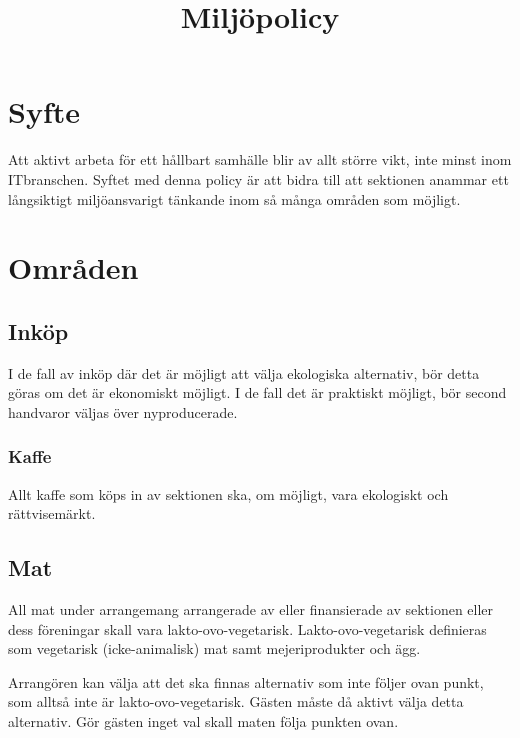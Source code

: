 \documentclass[11pt, includeaddress]{classes/cthit}
\begin{document}
\title{Miljöpolicy}
\maketitle

\thispagestyle{empty}

\newpage

\makeheadfoot%

\setcounter{tocdepth}{2}
\setcounter{page}{1}
\tableofcontents

\newpage

\section{Syfte}
Att aktivt arbeta för ett hållbart samhälle blir av allt större vikt, inte minst inom IT­branschen.
Syftet med denna policy är att bidra till att sektionen anammar ett långsiktigt miljöansvarigt
tänkande inom så många områden som möjligt.


\section{Områden}
\subsection{Inköp}
I de fall av inköp där det är möjligt att välja ekologiska alternativ, bör detta göras om det är
ekonomiskt möjligt.
I de fall det är praktiskt möjligt, bör second hand­varor väljas över nyproducerade.

\subsubsection{Kaffe}
Allt kaffe som köps in av sektionen ska, om möjligt, vara ekologiskt och rättvisemärkt.

\subsection{Mat}
All mat under arrangemang arrangerade av eller finansierade av sektionen eller dess föreningar skall vara lakto-ovo-vegetarisk. Lakto-ovo-vegetarisk definieras som vegetarisk (icke-animalisk) mat samt mejeriprodukter och ägg.

Arrangören kan välja att det ska finnas alternativ som inte följer ovan punkt, som alltså inte är lakto-ovo-vegetarisk. Gästen måste då aktivt välja detta alternativ. Gör gästen inget val skall maten följa punkten ovan.
\end{document}
